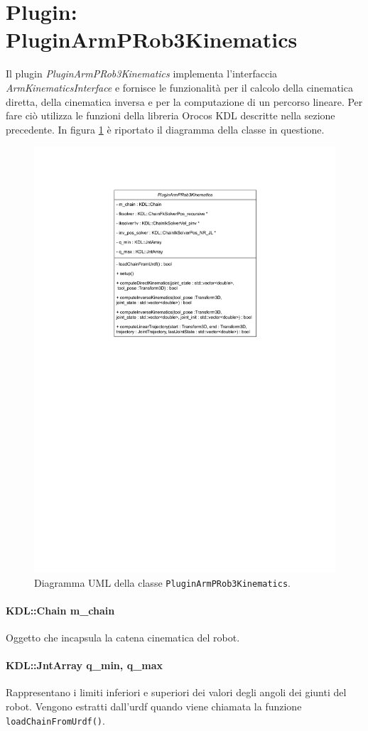 \section{Plugin: PluginArmPRob3Kinematics}
Il plugin \textit{PluginArmPRob3Kinematics} implementa l'interfaccia \textit{ArmKinematicsInterface} e fornisce le funzionalità per il calcolo della cinematica diretta, della cinematica inversa e per la computazione di un percorso lineare. Per fare ciò utilizza le funzioni della libreria Orocos KDL descritte nella sezione precedente. 
In figura \ref{fig:plugin_uml} è riportato il diagramma della classe in questione.
\begin{figure}[ht!]
	\centering
	\includegraphics[width=0.5\linewidth]{./ImageFiles/PluginArmPRob3Kinematics.drawio.pdf}
	\caption{Diagramma UML della classe \texttt{PluginArmPRob3Kinematics}.}
	\label{fig:plugin_uml}
\end{figure}

\paragraph{KDL::Chain m\_chain}
Oggetto che incapsula la catena cinematica del robot.

\paragraph{KDL::JntArray q\_min, q\_max}
Rappresentano i limiti inferiori e superiori dei valori degli angoli dei giunti del robot. Vengono estratti dall'urdf quando viene chiamata la funzione \texttt{loadChainFromUrdf()}.

